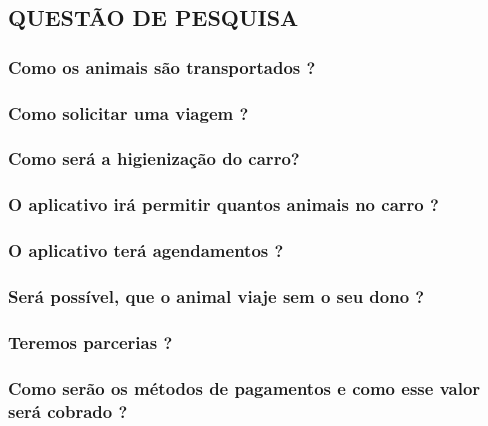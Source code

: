 
\begin{apendicesenv}

\partapendices

\chapter{QUESTÃO DE PESQUISA}

\subsection{Como os animais são transportados ?}
\label{p1}
\subsection{Como solicitar uma viagem ?}
\label{p2}
\subsection{Como será a higienização do carro?}
\label{p3}
\subsection{O aplicativo irá permitir quantos animais no carro ?}
\label{p4}
\subsection{O aplicativo terá agendamentos ?}
\label{p5}
\subsection{Será possível, que o animal viaje sem o seu dono ?}
\label{p6}
\subsection{Teremos parcerias ?}
\label{p7}
\subsection{Como serão os métodos de pagamentos e como esse valor será cobrado ?}
\label{p8}

\end{apendicesenv}
